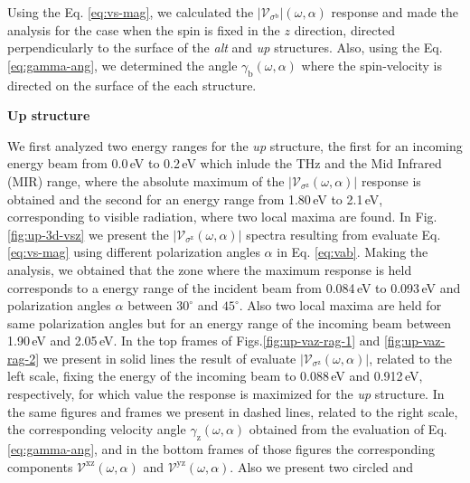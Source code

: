 \documentclass[prb,11pt,tightenlines,twocolumn,aps]{revtex4-1}
\begin{document}

Using the Eq. \eqref{eq:vs-mag}, we calculated the
$|\mathcal{V}_{\sigma^{\mathrm{b}}}|(\omega,\alpha)$ response and made the
analysis for the case when the spin is fixed in the $z$ direction, directed
perpendicularly to the surface of the \emph{alt} and \emph{up} structures. Also,
using the Eq. \eqref{eq:gamma-ang}, we determined the angle
$\gamma_{\mathrm{b}}(\omega,\alpha)$ where the spin-velocity is directed on the
surface of the each structure.

\textbf{Up structure}

We first analyzed two energy ranges for the \emph{up} structure, the first for
an incoming energy beam from 0.0\,eV to 0.2\,eV which inlude the THz and the Mid
Infrared (MIR) range, where the absolute maximum of the
$|\mathcal{V}_{\sigma^{\mathrm{z}}}(\omega,\alpha)|$ response is obtained and
the second for an energy range from 1.80\,eV to 2.1\,eV, corresponding to
visible radiation, where two local maxima are found.
% 
In Fig. \ref{fig:up-3d-vsz} we present the
$|\mathcal{V}_{\sigma^{\mathrm{z}}}(\omega,\alpha)|$ spectra resulting from
evaluate Eq. \eqref{eq:vs-mag} using different polarization angles $\alpha$ in
Eq. \eqref{eq:vab}.
% 
Making the analysis, we obtained that the zone where the maximum response is
held corresponds to a energy range of the incident beam from 0.084\,eV to
0.093\,eV and polarization angles $\alpha$ between $30^{\circ}$ and
$45^{\circ}$. Also two local maxima are held for same polarization angles but
for an energy range of the incoming beam between 1.90\,eV and 2.05\,eV.
In the top frames of Figs.\ref{fig:up-vaz-rag-1} and \ref{fig:up-vaz-rag-2} we
present in solid lines the result of evaluate
$|\mathcal{V}_{\sigma^{\mathrm{z}}}(\omega,\alpha)|$, related to the left scale,
fixing the energy of the incoming beam to 0.088\,eV and 0.912\,eV, respectively,
for which value the response is maximized for the \emph{up} structure. In the
same figures and frames we present in dashed lines, related to the right scale,
the corresponding velocity angle $\gamma_{\mathrm{z}}(\omega,\alpha)$ obtained
from the evaluation of Eq. \eqref{eq:gamma-ang}, and in the bottom frames of
those figures the corresponding components
$\mathcal{V}^{\mathrm{xz}}(\omega,\alpha)$ and
$\mathcal{V}^{\mathrm{yz}}(\omega,\alpha)$. Also we present two circled and
\end{document}
